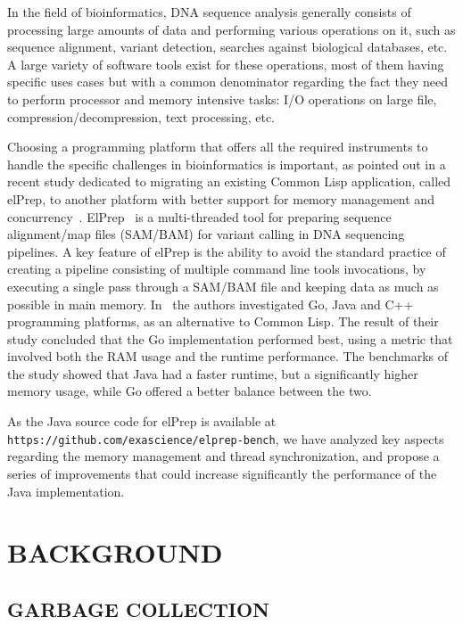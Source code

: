 \documentclass[a4paper,twoside]{article}
\begin{document}
In the field of bioinformatics, DNA sequence analysis \cite{doring:2008} generally consists of processing large amounts of data and performing
various operations on it,
such as sequence alignment, variant detection, searches against biological databases, etc.
A large variety of software tools exist for these operations, most of them having specific uses cases but with a common
denominator regarding the fact they need to perform processor and memory intensive tasks: I/O operations on large file,
compression/decompression, text processing, etc.

Choosing a programming platform that offers all the required instruments to handle the specific challenges in
bioinformatics is important,
as pointed out in a recent study dedicated to migrating an existing Common Lisp application, called elPrep, 
to another platform with better support for memory management and concurrency~\cite{costanza:2019}.
ElPrep~\cite{herzeel:2019} is a multi-threaded tool for preparing sequence alignment/map files (SAM/BAM)
for variant calling in DNA sequencing pipelines. 
A key feature of elPrep is the ability to avoid the standard practice of creating a pipeline consisting of multiple
command line tools invocations,
by executing a single pass through a SAM/BAM file and keeping data as much as possible in main memory.
In~\cite{costanza:2019} the authors investigated Go, Java and C++ programming platforms, as an alternative to Common Lisp.
The result of their study concluded that the Go implementation performed best, using a metric that involved both the
RAM usage and the runtime performance.
The benchmarks of the study showed that Java had a faster runtime, but a significantly higher memory usage, while Go
offered a better balance between the two.

As the Java source code for elPrep is available at {\texttt{https://github.com/exascience/elprep-bench}}, we have
analyzed key aspects regarding the memory management and thread synchronization, and propose a series of improvements
that could increase significantly the performance of the Java implementation.


\section{\uppercase{Background}}
\label{background}

\subsection{\uppercase{Garbage Collection}}
\label{background:gc}
\end{document}
